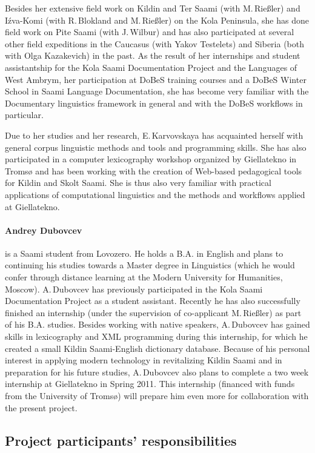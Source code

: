 \documentclass[a4paper,12pt]{article}
\begin{document}
{{Besides her extensive field work on Kildin and Ter Saami (with M.\,Rießler) and Iźva-Komi (with R.\,Blokland and M.\,Rießler) on the Kola Peninsula, she has done field work on Pite Saami (with J.\,Wilbur) and has also participated at several other field expeditions in the Caucasus (with Yakov Testelets) and Siberia (both with Olga Kazakevich) in the past. As the result of her internships and student assistantship for the Kola Saami Documentation Project and the Languages of West Ambrym, her participation at DoBeS training courses and a DoBeS Winter School in Saami Language Documentation, she has become very familiar with the Documentary linguistics framework in general and with the DoBeS workflows in particular.

Due to her studies and her research, E.\,Karvovskaya has acquainted herself with general corpus linguistic methods and tools and programming skills. She has also participated in a computer lexicography workshop organized by Giellatekno in Tromsø and has been working with the creation of Web-based pedagogical tools for Kildin and Skolt Saami. She is thus also very familiar with practical applications of computational linguistics and the methods and workflows applied at Giellatekno.

\paragraph{Andrey Dubovcev} is a Saami student from Lovozero. He holds a B.A. in English and plans to continuing his studies towards a Master degree in Linguistics (which he would confer through distance learning at the Modern University for Humanities, Moscow). A.\,Dubovcev has previously participated in the Kola Saami Documentation Project as a student assistant. Recently he has also successfully finished an internship (under the supervision of co-applicant M.\,Rießler) as part of his B.A. studies. Besides working with native speakers, A.\,Dubovcev has gained skills in lexicography and XML programming during this internship, for which he created a small Kildin Saami-English dictionary database. Because of his personal interest in applying modern technology in revitalizing Kildin Saami and in preparation for his future studies, A.\,Dubovcev also plans to complete a two week internship at Giellatekno in Spring 2011. This internship (financed with funds from the University of Tromsø) will prepare him even more for collaboration with the present project.

\subsection{Project participants' responsibilities}

}}
\end{document}
